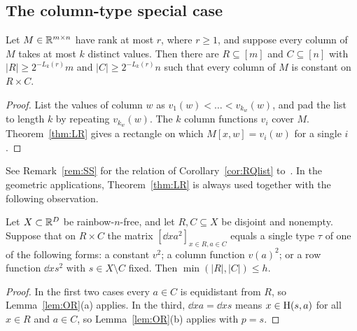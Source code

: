 \subsection{The column-type special case}

\begin{corollary}[RQ-list]\label{cor:RQlist}
Let $M\in\mathbb{R}^{m\times n}$ have rank at most $r$, where $r\ge 1$, and suppose every column of $M$ takes at most
$k$ distinct values. Then there are $R\subseteq[m]$ and $C\subseteq[n]$ with $|R|\ge2^{-L_k(r)}m$ and
$|C|\ge2^{-L_k(r)}n$ such that every column of $M$ is constant on $R\times C$.
\end{corollary}
\begin{proof}
List the values of column $w$ as $v_1(w)<\dots<v_{k_w}(w)$, and pad the list to length $k$ by repeating
$v_{k_w}(w)$. The $k$ column functions $v_i$ cover $M$. Theorem~\ref{thm:LR} gives a rectangle on which
$M[x,w]=v_i(w)$ for a single $i$.
\end{proof}
See Remark~\ref{rem:SS} for the relation of Corollary~\ref{cor:RQlist} to~\cite{SingerSudan}. In the geometric
applications, Theorem~\ref{thm:LR} is always used together with the following observation.

\begin{lemma}\label{lem:typeOR}
Let $X\subset\mathbb{R}^D$ be rainbow-$n$-free, and let $R,C\subseteq X$ be disjoint and nonempty. Suppose that on
$R\times C$ the matrix $[\dd xa^2]_{x\in R,a\in C}$ equals a single type $\tau$ of one of the following forms:
a constant $v^2$; a column function $v(a)^2$; or a row function $\dd xs^2$ with $s\in X\setminus C$ fixed. Then
$\min(|R|,|C|)\le h$.
\end{lemma}
\begin{proof}
In the first two cases every $a\in C$ is equidistant from $R$, so Lemma~\ref{lem:OR}(a) applies. In the third,
$\dd xa=\dd xs$ means $x\in\mathrm{H}(s,a)$ for all $x\in R$ and $a\in C$, so Lemma~\ref{lem:OR}(b) applies with
$p=s$.
\end{proof}
